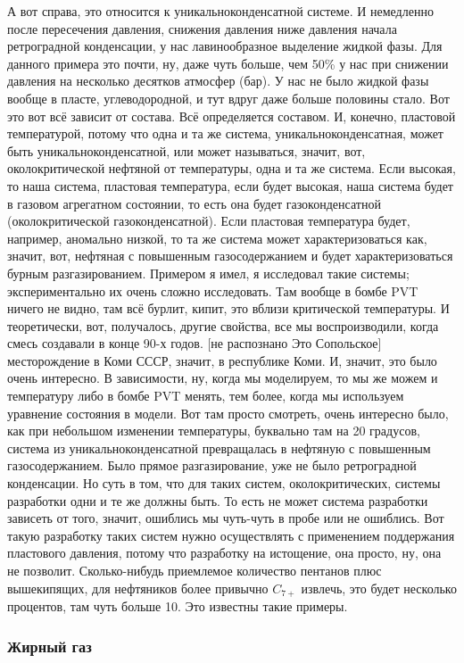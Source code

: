 \documentclass[main.tex]{subfiles}
\begin{document}
А вот справа, это относится к уникальноконденсатной системе.
И немедленно после пересечения давления, снижения давления ниже давления начала ретроградной конденсации, у нас лавинообразное выделение жидкой фазы.
Для данного примера это почти, ну, даже чуть больше, чем 50\% у нас при снижении давления на несколько десятков атмосфер (бар).
У нас не было жидкой фазы вообще в пласте, углеводородной, и тут вдруг даже больше половины стало.
Вот это вот всё зависит от состава.
Всё определяется составом.
И, конечно, пластовой температурой, потому что одна и та же система, уникальноконденсатная, может быть уникальноконденсатной, или может называться, значит, вот, околокритической нефтяной от температуры, одна и та же система.
Если высокая, то наша система, пластовая температура, если будет высокая, наша система будет в газовом агрегатном состоянии, то есть она будет газоконденсатной (околокритической газоконденсатной).
Если пластовая температура будет, например, аномально низкой, то та же система может характеризоваться как, значит, вот, нефтяная с повышенным газосодержанием и будет характеризоваться бурным разгазированием.
Примером я имел, я исследовал такие системы; экспериментально их очень сложно исследовать.
Там вообще в бомбе PVT ничего не видно, там всё бурлит, кипит, это вблизи критической температуры.
И теоретически, вот, получалось, другие свойства, все мы воспроизводили, когда смесь создавали в конце 90-х годов.
[не распознано Это Сопольское] месторождение в Коми СССР, значит, в республике Коми.
И, значит, это было очень интересно.
В зависимости, ну, когда мы моделируем, то мы же можем и температуру либо в бомбе PVT менять, тем более, когда мы используем уравнение состояния в модели.
Вот там просто смотреть, очень интересно было, как при небольшом изменении температуры, буквально там на 20 градусов, система из уникальноконденсатной превращалась в нефтяную с повышенным газосодержанием.
Было прямое разгазирование, уже не было ретроградной конденсации.
Но суть в том, что для таких систем, околокритических, системы разработки одни и те же должны быть.
То есть не может система разработки зависеть от того, значит, ошиблись мы чуть-чуть в пробе или не ошиблись.
Вот такую разработку таких систем нужно осуществлять с применением поддержания пластового давления, потому что разработку на истощение, она просто, ну, она не позволит.
Сколько-нибудь приемлемое количество пентанов плюс вышекипящих, для нефтяников более привычно $C_{7+}$ извлечь, это будет несколько процентов, там чуть больше 10.
Это известны такие примеры.

\subsubsection{Жирный газ}
\end{document}
